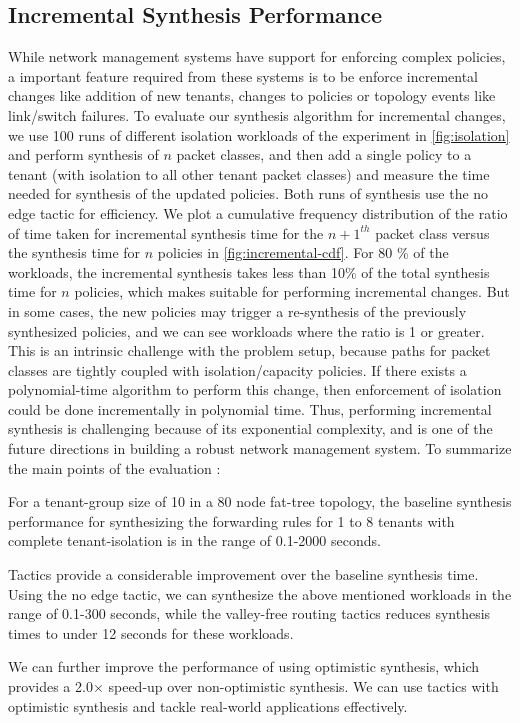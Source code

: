 \subsection{Incremental Synthesis Performance} \label{sec:incrementaleval}
While network management systems have support for enforcing complex policies, 
a important feature required from these systems is to be enforce incremental changes
like addition of new tenants, changes to policies or topology events like link/switch 
failures. To evaluate our synthesis algorithm for incremental changes, we use 100 runs of 
different isolation workloads of the experiment in  \cref{fig:isolation} and perform synthesis
of $n$ packet classes, and then
add a single policy to a tenant (with isolation to all other tenant packet classes) and
measure the time needed for synthesis of the updated policies. Both runs of synthesis use the
no edge tactic for efficiency. We plot a cumulative frequency 
distribution of the ratio of time taken for incremental synthesis time for the $n+1^{th}$ packet class
 versus the synthesis time for $n$ policies  in \cref{fig:incremental-cdf}. For 80 \% of the workloads, the incremental 
synthesis takes less than 10\% of the total synthesis time for $n$ policies, which makes \Name suitable for 
performing incremental changes. But in some cases, the new policies may trigger a re-synthesis 
of the previously synthesized policies, and we can see workloads where the ratio is 1 or greater. This 
is an intrinsic challenge with the problem setup, because paths for packet classes are tightly
coupled with isolation/capacity policies. If there exists a polynomial-time algorithm to perform
this change, then enforcement of isolation could be done incrementally in polynomial time.
Thus, performing incremental synthesis is challenging because of its exponential complexity,
and is one of the future directions
in building a robust network management system. \newline
To summarize the main points of the evaluation : 
\begin{compactitemize}
	\item For a tenant-group size of 10 in a 80 node fat-tree topology, the baseline 
	synthesis performance for synthesizing the forwarding rules for 1 to 8 tenants with 
	complete tenant-isolation is in the range of 0.1-2000 seconds. 
	\item Tactics provide a considerable improvement over the baseline synthesis time.
	 Using the no edge tactic, we can synthesize the above mentioned workloads in the 
	 range of 0.1-300 seconds, while the valley-free routing tactics reduces synthesis
	 times to under 12 seconds for these workloads. 
	 \item We can further improve the performance of \Name using optimistic synthesis,
	 which provides a 2.0$\times$ speed-up over non-optimistic synthesis. We can use
	 tactics with optimistic synthesis and tackle real-world applications effectively. 
\end{compactitemize}


